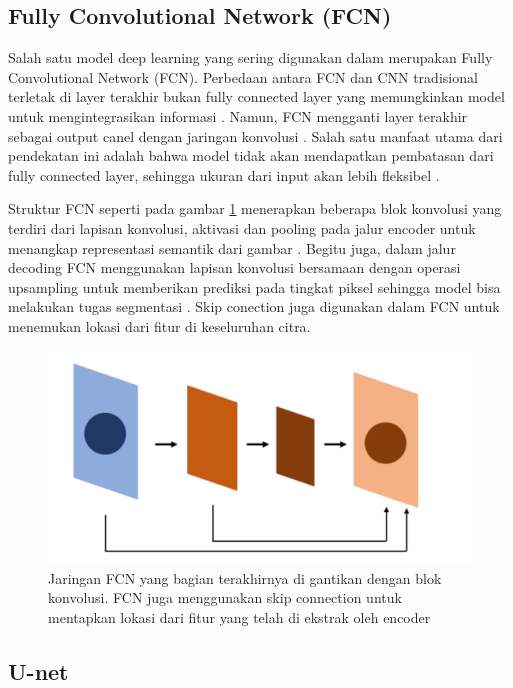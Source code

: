 \subsection{Fully Convolutional Network (FCN)}

Salah satu model deep learning yang sering digunakan dalam merupakan Fully Convolutional Network (FCN). Perbedaan antara FCN dan CNN tradisional terletak di layer terakhir bukan fully connected layer yang memungkinkan model untuk mengintegrasikan informasi . Namun, FCN mengganti layer terakhir sebagai output canel dengan jaringan konvolusi \cite{shlezinger_model-based_2023,huang_fully_2022}. Salah satu manfaat utama dari pendekatan ini adalah bahwa model tidak akan mendapatkan pembatasan dari fully connected layer, sehingga ukuran dari input akan lebih fleksibel \cite{iqbal_analyses_2023}.


Struktur FCN seperti pada gambar \ref{fig:fcn} menerapkan beberapa blok konvolusi yang terdiri dari lapisan konvolusi, aktivasi dan pooling pada jalur encoder untuk menangkap representasi semantik dari gambar \cite{azad_medical_2022}. Begitu juga, dalam jalur decoding FCN menggunakan lapisan konvolusi bersamaan dengan operasi upsampling untuk memberikan prediksi pada tingkat piksel sehingga model bisa melakukan tugas segmentasi \cite{deng_fcn_2023}. Skip conection juga digunakan dalam FCN untuk menemukan lokasi dari fitur di keseluruhan citra. 

\begin{figure}[H]
	\centering
	\includegraphics[scale=.2]{gambar/gambar-fcn.png}
	\caption{Jaringan FCN yang bagian terakhirnya di gantikan dengan blok konvolusi. FCN juga menggunakan skip connection untuk mentapkan lokasi dari fitur yang telah di ekstrak oleh encoder}
	\label{fig:fcn}
\end{figure}


\subsection{U-net}

